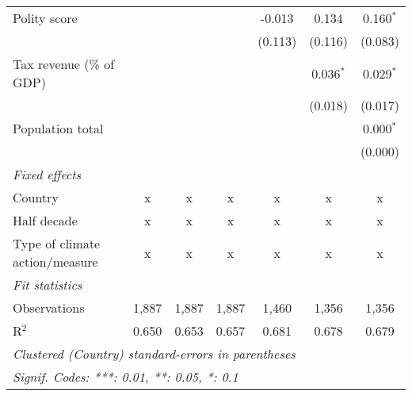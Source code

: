 \begin{tabular}{lcccccc}
   Polity score                                                         &         &                &                & -0.013         & 0.134          & 0.160$^{*}$\\   
                                                                        &         &                &                & (0.113)        & (0.116)        & (0.083)\\   
   Tax revenue (\% of GDP)                                              &         &                &                &                & 0.036$^{*}$    & 0.029$^{*}$\\   
                                                                        &         &                &                &                & (0.018)        & (0.017)\\   
   Population total                                                     &         &                &                &                &                & 0.000$^{*}$\\   
                                                                        &         &                &                &                &                & (0.000)\\   
   \emph{Fixed effects}\\
   Country                                                              & x       & x              & x              & x              & x              & x\\  
   Half decade                                                          & x       & x              & x              & x              & x              & x\\  
   Type of climate action/measure                                       & x       & x              & x              & x              & x              & x\\  
   \midrule \emph{Fit statistics}\\
   Observations                                                         & 1,887   & 1,887          & 1,887          & 1,460          & 1,356          & 1,356\\  
   R$^2$                                                                & 0.650   & 0.653          & 0.657          & 0.681          & 0.678          & 0.679\\  
   \midrule
   \multicolumn{7}{l}{\emph{Clustered (Country) standard-errors in parentheses}}\\
   \multicolumn{7}{l}{\emph{Signif. Codes: ***: 0.01, **: 0.05, *: 0.1}}\\
\end{tabular}
\par\endgroup


